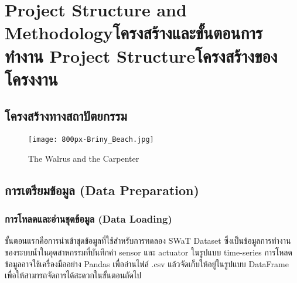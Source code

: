 \chapter{\ifproject%
\ifenglish Project Structure and Methodology\else โครงสร้างและขั้นตอนการทำงาน\fi
\else%
\ifenglish Project Structure\else โครงสร้างของโครงงาน\fi
\fi
}

\makeatletter


\makeatother

\section{โครงสร้างทางสถาปัตยกรรม}

\begin{figure}[h]
\begin{center}
\texttt{[image: 800px-Briny\_Beach.jpg]}
\end{center}
\caption[Poem]{The Walrus and the Carpenter}
\label{fig:walrus}
\end{figure}

\section{การเตรียมข้อมูล (Data Preparation)}
\subsection{การโหลดและอ่านชุดข้อมูล (Data Loading)}
\hspace{2em} ขั้นตอนแรกคือการนำเข้าชุดข้อมูลที่ใช้สำหรับการทดลอง SWaT Dataset ซึ่งเป็นข้อมูลการทำงานของระบบน้ำในอุตสาหกรรมที่บันทึกค่า sensor และ actuator ในรูปแบบ time-series 
การโหลดข้อมูลอาจใช้เครื่องมืออย่าง Pandas เพื่ออ่านไฟล์ .csv แล้วจัดเก็บให้อยู่ในรูปแบบ DataFrame เพื่อให้สามารถจัดการได้สะดวกในขั้นตอนถัดไป

